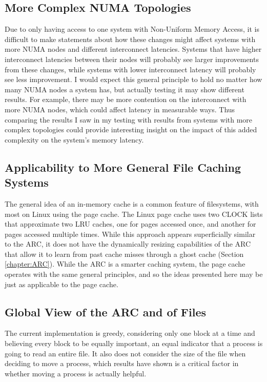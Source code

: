 \subsection{More Complex NUMA Topologies}
Due to only having access to one system with Non-Uniform Memory Access, it is difficult to make statements about how these
changes might affect systems with more NUMA nodes and different interconnect latencies.
Systems that have higher interconnect latencies between their nodes will probably see larger improvements from these changes,
while systems with lower interconnect latency will probably see less improvement.
I would expect this general principle to hold no matter how many NUMA nodes a system has, but actually testing it may show different results.
For example, there may be more contention on the interconnect with more NUMA nodes, which could affect latency in measurable ways.
Thus comparing the results I saw in my testing with results from systems with more complex topologies could provide interesting insight
on the impact of this added complexity on the system's memory latency.

\subsection{Applicability to More General File Caching Systems}
The general idea of an in-memory cache is a common feature of filesystems, with most on Linux using the page cache.
The Linux page cache uses two CLOCK lists that approximate two LRU caches, one for pages accessed once,
and another for pages accessed multiple times.
While this approach appears superficially similar to the ARC, it does not have the dynamically resizing capabilities of
the ARC that allow it to learn from past cache misses through a ghost cache (Section \ref{chapter:ARC}).
While the ARC is a smarter caching system, the page cache operates with the same general principles,
and so the ideas presented here may be just as applicable to the page cache.

\subsection{Global View of the ARC and of Files}
The current implementation is greedy, considering only one block at a time and believing every block to be equally important, an equal indicator that a process is going to read an entire file.
It also does not consider the size of the file when deciding to move a process,
which results have shown is a critical factor in whether moving a process is actually helpful.

